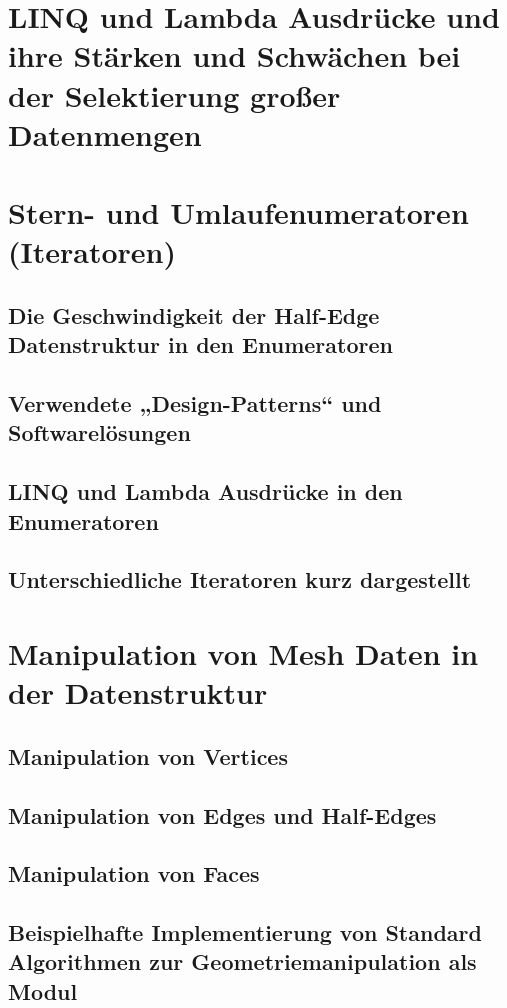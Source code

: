 \documentclass[12pt,a4paper]{scrreprt}
\begin{document}
	\section {LINQ und Lambda Ausdrücke und ihre Stärken und Schwächen bei der Selektierung großer Datenmengen}
	\section {Stern- und Umlaufenumeratoren (Iteratoren)}
		\subsection {Die Geschwindigkeit der Half-Edge Datenstruktur in den Enumeratoren}
		\subsection {Verwendete „Design-Patterns“ und Softwarelösungen}
		\subsection {LINQ und Lambda Ausdrücke in den Enumeratoren}
		\subsection {Unterschiedliche Iteratoren kurz dargestellt}
	\section {Manipulation von Mesh Daten in der Datenstruktur}
		\subsection {Manipulation von Vertices}
		\subsection {Manipulation von Edges und Half-Edges}
		\subsection {Manipulation von Faces}
		\subsection {Beispielhafte Implementierung von Standard Algorithmen zur Geometriemanipulation als Modul}
\end{document}
